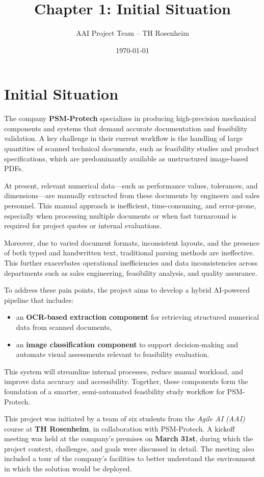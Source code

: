 \documentclass[12pt]{article}
\title{Chapter 1: Initial Situation}
\author{AAI Project Team -- TH Rosenheim}
\date{\today}
\begin{document}
\maketitle

\section{Initial Situation}

The company \textbf{PSM-Protech} specializes in producing high-precision mechanical components and systems that demand accurate documentation and feasibility validation. A key challenge in their current workflow is the handling of large quantities of scanned technical documents, such as feasibility studies and product specifications, which are predominantly available as unstructured image-based PDFs.

At present, relevant numerical data—such as performance values, tolerances, and dimensions—are manually extracted from these documents by engineers and sales personnel. This manual approach is inefficient, time-consuming, and error-prone, especially when processing multiple documents or when fast turnaround is required for project quotes or internal evaluations.

Moreover, due to varied document formats, inconsistent layouts, and the presence of both typed and handwritten text, traditional parsing methods are ineffective. This further exacerbates operational inefficiencies and data inconsistencies across departments such as sales engineering, feasibility analysis, and quality assurance.

To address these pain points, the project aims to develop a hybrid AI-powered pipeline that includes:
\begin{itemize}
    \item an \textbf{OCR-based extraction component} for retrieving structured numerical data from scanned documents,
    \item an \textbf{image classification component} to support decision-making and automate visual assessments relevant to feasibility evaluation.
\end{itemize}

This system will streamline internal processes, reduce manual workload, and improve data accuracy and accessibility. Together, these components form the foundation of a smarter, semi-automated feasibility study workflow for PSM-Protech.

This project was initiated by a team of six students from the \textit{Agile AI (AAI)} course at \textbf{TH Rosenheim}, in collaboration with PSM-Protech. A kickoff meeting was held at the company's premises on \textbf{March 31st}, during which the project context, challenges, and goals were discussed in detail. The meeting also included a tour of the company's facilities to better understand the environment in which the solution would be deployed.
\end{document}
